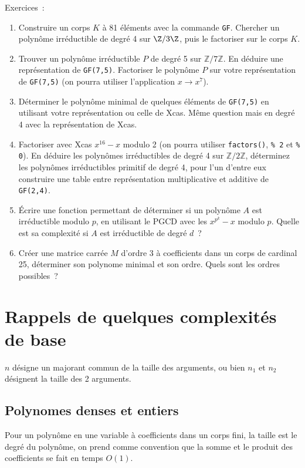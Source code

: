 \documentclass[a4paper,11pt]{book}
\begin{document}
\begin{giacjshere}
Exercices~:
\begin{enumerate}
\item Construire un corps $K$ \`a 81 \'el\'ements avec la commande \verb|GF|.
Chercher un polyn\^ome irr\'eductible de degr\'e 4 sur $\Z/3\Z$,
puis le factoriser sur le corps $K$.
\item Trouver un polyn\^ome irr\'eductible $P$ de degr\'e 5 sur $\mathbb{Z}/7\mathbb{Z}$.
En d\'eduire une repr\'esentation de \verb|GF(7,5)|. Factoriser 
le polyn\^ome $P$ sur votre repr\'esentation de \verb|GF(7,5)| (on pourra utiliser
l'application $x \rightarrow x^7$).
\item D\'eterminer le polyn\^ome minimal de quelques \'el\'ements
de \verb|GF(7,5)| en utilisant votre repr\'esentation ou celle de Xcas.
M\^eme question mais en degr\'e 4 avec la repr\'esentation de Xcas.
\item Factoriser avec Xcas $x^{16}-x$ modulo 2 (on pourra utiliser
\verb|factors()|, \verb|% 2| et \verb|% 0|). 
En d\'eduire les polyn\^omes irr\'eductibles de degr\'e 4 sur
  $\mathbb{Z}/2\mathbb{Z}$, d\'eterminez les polyn\^omes irr\'eductibles
primitif de degr\'e 4, pour l'un d'entre eux construire une table 
entre repr\'esentation
multiplicative et additive de \verb|GF(2,4)|.
\item \'Ecrire une fonction permettant de d\'eterminer si un
  polyn\^ome $A$ est irr\'eductible modulo $p$, en utilisant le
PGCD avec les $x^{p^k}-x$ modulo $p$. 
Quelle est sa complexit\'e si $A$ est irr\'eductible de degr\'e $d$~?
\item Cr\'eer une matrice carr\'ee $M$ d'ordre 3 \`a coefficients
dans un corps de cardinal 25, d\'eterminer son polynome
minimal et son ordre. Quels sont les ordres possibles~?
\end{enumerate}

\pagebreak

\section{Rappels de quelques complexit\'es de base}
$n$ d\'esigne un majorant commun de la taille des arguments, ou bien
$n_1$ et $n_2$ d\'esignent la taille des 2 arguments.

\subsection{Polynomes denses et entiers}
Pour un polyn\^ome en une variable
\`a coefficients dans un corps fini, la taille est
le degr\'e du polyn\^ome, on prend comme convention que
la somme et le produit des coefficients se fait en temps $O(1)$.


\end{giacjshere}
\end{document}
